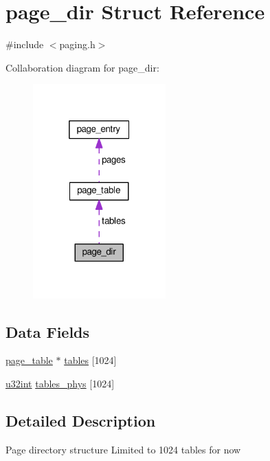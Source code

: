 \hypertarget{structpage__dir}{}\section{page\+\_\+dir Struct Reference}
\label{structpage__dir}


{\ttfamily \#include $<$paging.\+h$>$}



Collaboration diagram for page\+\_\+dir\+:\nopagebreak
\begin{figure}[H]
\begin{center}
\leavevmode
\includegraphics[width=145pt]{structpage__dir__coll__graph}
\end{center}
\end{figure}
\subsection*{Data Fields}
\begin{DoxyCompactItemize}
\item 
\hyperlink{structpage__table}{page\+\_\+table} $\ast$ \hyperlink{structpage__dir_a3d121c0f2d5bf9079178a0889d26ae94}{tables} \mbox{[}1024\mbox{]}
\item 
\hyperlink{system_8h_a757de76cafbcddaac0d1632902fe4cb8}{u32int} \hyperlink{structpage__dir_a67d4c7f42d2b63673971e15ebabed897}{tables\+\_\+phys} \mbox{[}1024\mbox{]}
\end{DoxyCompactItemize}


\subsection{Detailed Description}
Page directory structure Limited to 1024 tables for now 

